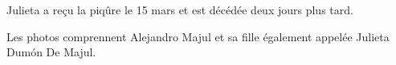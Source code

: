 Julieta a reçu la piqûre le 15 mars et est décédée deux jours plus tard.

Les photos comprennent Alejandro Majul et sa fille également appelée Julieta
Dumón De Majul.

